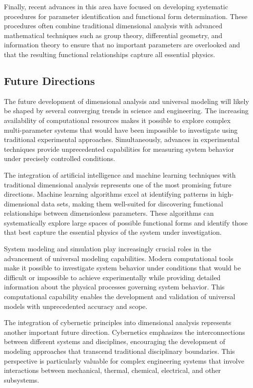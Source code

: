 \documentclass[
	11pt, %
	fleqn, %
	a4paper, %
]{LegrandOrangeBook}
\begin{document}
Finally, recent advances in this area have focused on developing systematic procedures for parameter identification and functional form determination. These procedures often combine traditional dimensional analysis with advanced mathematical techniques such as group theory, differential geometry, and information theory to ensure that no important parameters are overlooked and that the resulting functional relationships capture all essential physics.

\subsection{Future Directions}

The future development of dimensional analysis and universal modeling will likely be shaped by several converging trends in science and engineering. The increasing availability of computational resources makes it possible to explore complex multi-parameter systems that would have been impossible to investigate using traditional experimental approaches. Simultaneously, advances in experimental techniques provide unprecedented capabilities for measuring system behavior under precisely controlled conditions.

The integration of artificial intelligence and machine learning techniques with traditional dimensional analysis represents one of the most promising future directions. Machine learning algorithms excel at identifying patterns in high-dimensional data sets, making them well-suited for discovering functional relationships between dimensionless parameters. These algorithms can systematically explore large spaces of possible functional forms and identify those that best capture the essential physics of the system under investigation.

System modeling and simulation play increasingly crucial roles in the advancement of universal modeling capabilities. Modern computational tools make it possible to investigate system behavior under conditions that would be difficult or impossible to achieve experimentally while providing detailed information about the physical processes governing system behavior. This computational capability enables the development and validation of universal models with unprecedented accuracy and scope.

The integration of cybernetic principles into dimensional analysis represents another important future direction. Cybernetics emphasizes the interconnections between different systems and disciplines, encouraging the development of modeling approaches that transcend traditional disciplinary boundaries. This perspective is particularly valuable for complex engineering systems that involve interactions between mechanical, thermal, chemical, electrical, and other subsystems.
\end{document}

